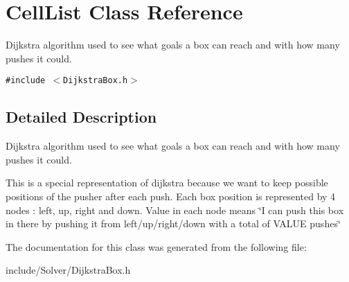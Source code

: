\section{CellList Class Reference}
\label{classCellList}
Dijkstra algorithm used to see what goals a box can reach and with how many pushes it could.  


{\tt \#include $<$DijkstraBox.h$>$}



\subsection{Detailed Description}
Dijkstra algorithm used to see what goals a box can reach and with how many pushes it could. 

This is a special representation of dijkstra because we want to keep possible positions of the pusher after each push. Each box position is represented by 4 nodes : left, up, right and down. Value in each node means \char`\"{}I can push this box in there by pushing it from left/up/right/down with a total of VALUE pushes\char`\"{} 

The documentation for this class was generated from the following file:\begin{CompactItemize}
\item 
include/Solver/DijkstraBox.h\end{CompactItemize}
